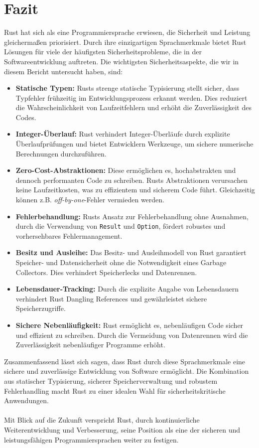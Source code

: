 \chapter{Fazit}

Rust hat sich als eine Programmiersprache erwiesen, die Sicherheit und Leistung gleichermaßen priorisiert. 
Durch ihre einzigartigen Sprachmerkmale bietet Rust Lösungen für viele der häufigsten Sicherheitsprobleme, die in der Softwareentwicklung auftreten. 
Die wichtigsten Sicherheitsaspekte, die wir in diesem Bericht untersucht haben, sind:

\begin{itemize}
    \item \textbf{Statische Typen:} Rusts strenge statische Typisierung stellt sicher, dass Typfehler frühzeitig im Entwicklungsprozess erkannt werden. 
      Dies reduziert die Wahrscheinlichkeit von Laufzeitfehlern und erhöht die Zuverlässigkeit des Codes.
    \item \textbf{Integer-Überlauf:} Rust verhindert Integer-Überläufe durch explizite Überlaufprüfungen und bietet Entwicklern Werkzeuge, um sichere numerische Berechnungen durchzuführen.

    \item \textbf{Zero-Cost-Abstraktionen:} Diese ermöglichen es, hochabstrakten und dennoch performanten Code zu schreiben. 
      Rusts Abstraktionen verursachen keine Laufzeitkosten, was zu effizientem und sicherem Code führt. Gleichzeitig können z.B. \textit{\gls{off-by-one}}-Fehler vermieden werden.

    \item \textbf{Fehlerbehandlung:} Rusts Ansatz zur Fehlerbehandlung ohne Ausnahmen, durch die Verwendung von \texttt{Result} und \texttt{Option}, fördert robustes und vorhersehbares Fehlermanagement.

    \item \textbf{Besitz und Ausleihe:} Das Besitz- und Ausleihmodell von Rust garantiert Speicher- und Datensicherheit ohne die Notwendigkeit eines Garbage Collectors. 
      Dies verhindert Speicherlecks und Datenrennen.

    \item \textbf{Lebensdauer-Tracking:} Durch die explizite Angabe von Lebensdauern verhindert Rust Dangling References und gewährleistet sichere Speicherzugriffe.

    \item \textbf{Sichere Nebenläufigkeit:} Rust ermöglicht es, nebenläufigen Code sicher und effizient zu schreiben. 
      Durch die Vermeidung von Datenrennen wird die Zuverlässigkeit nebenläufiger Programme erhöht.    
\end{itemize}
\noindent
Zusammenfassend lässt sich sagen, dass Rust durch diese Sprachmerkmale eine sichere und zuverlässige Entwicklung von Software ermöglicht. 
Die Kombination aus statischer Typisierung, sicherer Speicherverwaltung und robustem Fehlerhandling macht Rust zu einer idealen Wahl für sicherheitskritische Anwendungen.\\
\\
Mit Blick auf die Zukunft verspricht Rust, durch kontinuierliche Weiterentwicklung und Verbesserung, seine Position als eine der sicheren und leistungsfähigen Programmiersprachen weiter zu festigen.

